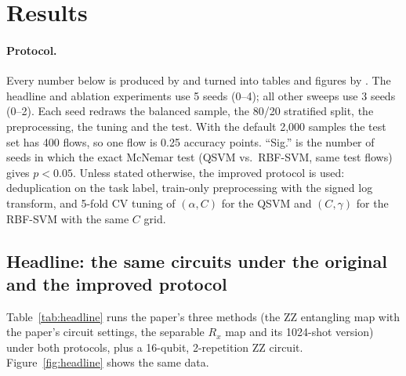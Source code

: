 \section{Results}
\label{sec:results}

\paragraph{Protocol.} Every number below is produced by  and turned into tables
and figures by . The headline and ablation experiments use 5 seeds
(0--4); all other sweeps use 3 seeds (0--2). Each seed redraws the balanced sample, the
80/20 stratified split, the preprocessing, the tuning and the test. With the default 2{,}000
samples the test set has 400 flows, so one flow is 0.25 accuracy points. ``Sig.'' is the number
of seeds in which the exact McNemar test (QSVM vs.\ RBF-SVM, same test flows) gives $p<0.05$.
Unless stated otherwise, the improved protocol is used: deduplication on the task label,
train-only preprocessing with the signed log transform, and 5-fold CV tuning of
$(\alpha, C)$ for the QSVM and $(C,\gamma)$ for the RBF-SVM with the same $C$ grid.

\subsection{Headline: the same circuits under the original and the improved protocol}

Table~\ref{tab:headline} runs the paper's three methods (the ZZ entangling map with the
paper's circuit settings, the separable $R_x$ map and its 1024-shot version) under both
protocols, plus a 16-qubit, 2-repetition ZZ circuit. Figure~\ref{fig:headline} shows the same
data.

\begin{table}[H]
\centering\small
\caption{Test accuracy (\%) and QSVM macro-F1 (\%), mean $\pm$ std over 5 seeds. ``Legacy'' is
the original protocol (); ``improved'' is the corrected one. ZZ uses the paper's
settings: 8 qubits / 2 reps (binary) and 16 qubits / 1 rep (multiclass). $R_x$ uses 16 qubits.}
\label{tab:headline}
\end{table}


